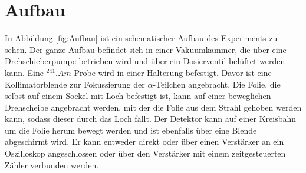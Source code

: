 \section{Aufbau}
\label{sec:Aufbau}

In Abbildung \ref{fig:Aufbau} ist ein schematischer Aufbau des Experiments zu sehen.
Der ganze Aufbau befindet sich in einer Vakuumkammer, die über eine Drehschieberpumpe betrieben wird und über ein Dosierventil belüftet werden kann.
Eine $^{241}.{Am}$-Probe wird in einer Halterung befestigt. Davor ist eine Kollimatorblende zur Fokussierung der $\alpha$-Teilchen angebracht.
Die Folie, die selbst auf einem Sockel mit Loch befestigt ist, kann auf einer beweglichen Drehscheibe angebracht werden, mit der die Folie aus dem Strahl gehoben werden kann, sodass dieser durch das Loch fällt.
Der Detektor kann auf einer Kreisbahn um die Folie herum bewegt werden und ist ebenfalls über eine Blende abgeschirmt wird.
Er kann entweder direkt oder über einen Verstärker an ein Oszilloskop angeschlossen oder über den Verstärker mit einem zeitgesteuerten Zähler verbunden werden.
